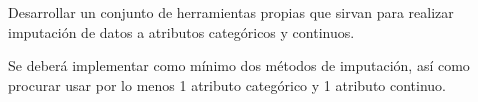 Desarrollar un conjunto de herramientas propias que sirvan para realizar imputación de datos a atributos categóricos y continuos. 

Se deberá implementar como mínimo dos métodos de imputación, así como procurar usar por lo menos 1 atributo categórico y 1 atributo continuo.

